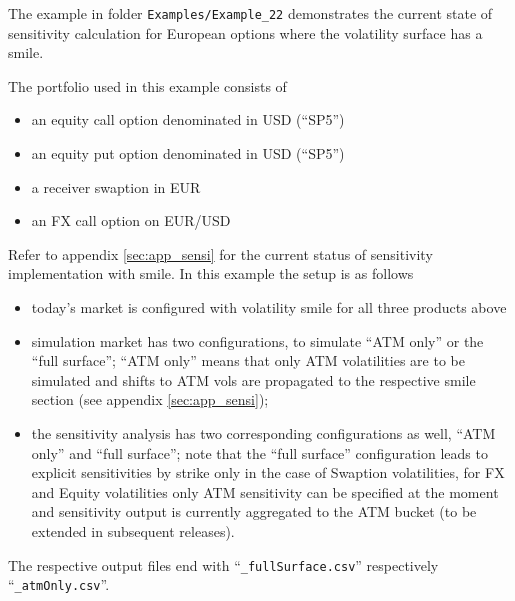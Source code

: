 \documentclass[12pt, a4paper]{article}
\begin{document}
{The example in folder {\tt Examples/Example\_22} demonstrates the current state of sensitivity calculation for European options where the volatility surface has a smile. 

\medskip
The portfolio used in this example consists of
\begin{itemize}
	\item an equity call option denominated in USD (``SP5'')
	\item an equity put option denominated in USD (``SP5'')
	\item a receiver swaption in EUR
	\item an FX call option on EUR/USD
\end{itemize}

\medskip
Refer to appendix \ref{sec:app_sensi} for the current status of sensitivity implementation with smile. In this example the setup is as follows
\begin{itemize}
\item today's market is configured with volatility smile for all three products above
\item simulation market has two configurations, to simulate ``ATM only'' or the ``full surface''; ``ATM only'' means that only ATM volatilities are to be simulated and shifts to ATM vols are propagated to the respective smile section (see appendix \ref{sec:app_sensi});  
\item the sensitivity analysis has two corresponding configurations as well, ``ATM only'' and ``full surface''; note that the ``full surface'' configuration leads to explicit sensitivities by strike only in the case of Swaption volatilities, for FX and Equity volatilities only ATM sensitivity can be specified at the moment and sensitivity output is currently aggregated to the ATM bucket (to be extended in subsequent releases).
\end{itemize}

The respective output files end with ``{\tt\_fullSurface.csv}'' respectively ``{\tt\_atmOnly.csv}''.



}
\end{document}
